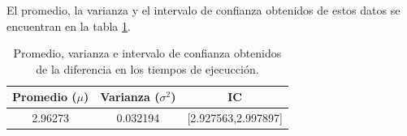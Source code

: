 El promedio, la varianza y el intervalo de confianza obtenidos de estos datos se encuentran en la tabla \ref{table:datos}.

\begin{table}[H]
    \centering
    \begin{tabular}{ccc} \hline
        \textbf{Promedio} ($\mu$) & \textbf{Varianza} ($\sigma^2$) & \textbf{IC}         \\ \hline
        2.96273                   & 0.032194                       & [2.927563,2.997897] \\ \hline
    \end{tabular}
    \caption{Promedio, varianza e intervalo de confianza obtenidos de la diferencia en los tiempos de ejecucción.}
    \label{table:datos}
\end{table}

